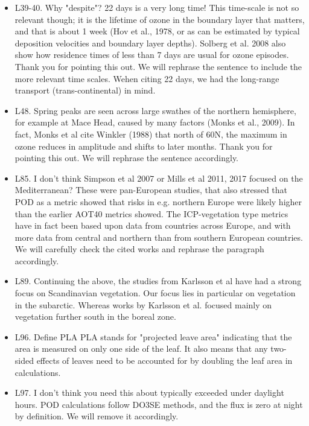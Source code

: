 \documentclass{scrartcl}
\begin{document}
\begin{itemize}
\item {\color{blue}L39-40. Why "despite"? 22 days is a very long time! This time-scale is not so relevant though; it is the lifetime of ozone in the boundary layer that matters, and that is about 1 week (Hov et al., 1978, or as can be estimated by typical deposition velocities and boundary layer depths). Solberg et al. 2008 also show how residence times of less than 7 days are usual for ozone episodes.} Thank you for pointing this out. We will rephrase the sentence to include the more relevant time scales. Wehen citing 22 days, we had the long-range transport (trans-continental) in mind.

\item {\color{blue}L48. Spring peaks are seen across large swathes of the northern hemisphere, for example at Mace Head, caused by many factors (Monks et al., 2009). In fact, Monks et al cite Winkler (1988) that north of 60N, the maximum in ozone reduces in amplitude and shifts to later months.}
Thank you for pointing this out. We will rephrase the sentence accordingly.

\item {\color{blue}L85. I don't think Simpson et al 2007 or Mills et al 2011, 2017 focused on the Mediterranean? These were pan-European studies, that also stressed that POD as a metric showed that risks in e.g. northern Europe were likely higher than the earlier AOT40 metrics showed. The ICP-vegetation type metrics have in fact been based upon data from countries across Europe, and with more data from central and northern than from southern European countries.}
We will carefully check the cited works and rephrase the paragraph accordingly. 

\item {\color{blue}L89. Continuing the above, the studies from Karlsson et al have had a strong focus on Scandinavian vegetation.}
Our focus lies in particular on vegetation in the subarctic. Whereas works by Karlsson et al. focused mainly on vegetation further south in the boreal zone. 

\item {\color{blue}L96. Define PLA}
PLA stands for "projected leave area" indicating that the area is measured on only one side of the leaf. It also means that any two-sided effects of leaves need to be accounted for by doubling the leaf area in calculations.

\item {\color{blue}L97. I don't think you need this about typically exceeded under daylight hours. POD calculations follow DO3SE methods, and the flux is zero at night by definition.} We will remove it accordingly.


\end{itemize}
\end{document}
